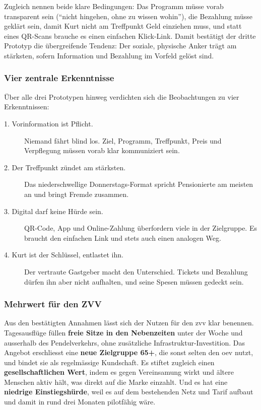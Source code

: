 Zugleich nennen beide klare Bedingungen: Das Programm müsse vorab transparent sein (\enquote{nicht hingehen, ohne zu wissen wohin}), die Bezahlung müsse geklärt sein, damit Kurt nicht am Treffpunkt Geld einziehen muss, und statt eines QR-Scans brauche es einen einfachen Klick-Link. Damit bestätigt der dritte Prototyp die übergreifende Tendenz: Der soziale, physische Anker trägt am stärksten, sofern Information und Bezahlung im Vorfeld gelöst sind.

\subsubsection{Vier zentrale Erkenntnisse}
Über alle drei Prototypen hinweg verdichten sich die Beobachtungen zu vier Erkenntnissen:

\begin{description}
  \item[1. Vorinformation ist Pflicht.] Niemand fährt blind los. Ziel, Programm, Treffpunkt, Preis und Verpflegung müssen vorab klar kommuniziert sein.
  \item[2. Der Treffpunkt zündet am stärksten.] Das niederschwellige Donnerstags-Format spricht Pensionierte am meisten an und bringt Fremde zusammen.
  \item[3. Digital darf keine Hürde sein.] QR-Code, App und Online-Zahlung überfordern viele in der Zielgruppe. Es braucht den einfachen Link und stets auch einen analogen Weg.
  \item[4. Kurt ist der Schlüssel, entlastet ihn.] Der vertraute Gastgeber macht den Unterschied. Tickets und Bezahlung dürfen ihn aber nicht aufhalten, und seine Spesen müssen gedeckt sein.
\end{description}

\subsubsection{Mehrwert für den ZVV}
Aus den bestätigten Annahmen lässt sich der Nutzen für den \gls{zvv} klar benennen. Tagesausflüge füllen \textbf{freie Sitze in den Nebenzeiten} unter der Woche und ausserhalb des Pendelverkehrs, ohne zusätzliche Infrastruktur-Investition. Das Angebot erschliesst eine \textbf{neue Zielgruppe 65+}, die sonst selten den \gls{oev} nutzt, und bindet sie als regelmässige Kundschaft. Es stiftet zugleich einen \textbf{gesellschaftlichen Wert}, indem es gegen Vereinsamung wirkt und ältere Menschen aktiv hält, was direkt auf die Marke einzahlt. Und es hat eine \textbf{niedrige Einstiegshürde}, weil es auf dem bestehenden Netz und Tarif aufbaut und damit in rund drei Monaten pilotfähig wäre.

